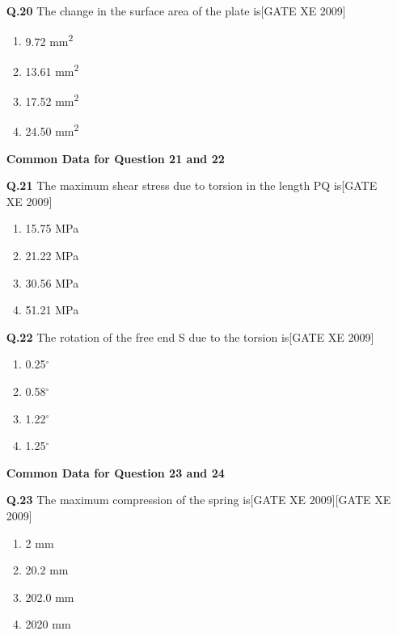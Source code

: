 \documentclass[journal,12pt,onecolumn]{IEEEtran}
\theoremstyle{remark}
\begin{document}
\begin{enumerate}
\begin{enumerate}
\vspace{0.3cm}

\item[ \textbf{Q.20}] The change in the surface area of the plate is\hfill[GATE XE 2009]
\begin{multicols}{2}
\begin{enumerate}
    \item 9.72 mm\textsuperscript{2}
    \item 13.61 mm\textsuperscript{2}
    \item 17.52 mm\textsuperscript{2}
    \item 24.50 mm\textsuperscript{2}
\end{enumerate}
\end{multicols}

\vspace{0.3cm}

\textbf{Common Data for Question 21 and 22}

\item[ \textbf{Q.21}] The maximum shear stress due to torsion in the length PQ is\hfill[GATE XE 2009]
\begin{multicols}{2}
\begin{enumerate}
    \item 15.75 MPa
    \item 21.22 MPa
    \item 30.56 MPa
    \item 51.21 MPa
\end{enumerate}
\end{multicols}

\item [\textbf{Q.22}] The rotation of the free end S due to the torsion is\hfill[GATE XE 2009]
\begin{multicols}{2}
\begin{enumerate}
    \item 0.25$^\circ$
    \item 0.58$^\circ$
    \item 1.22$^\circ$
    \item 1.25$^\circ$
\end{enumerate}
\end{multicols}

\vspace{0.3cm}

\textbf{Common Data for Question 23 and 24}

\item [\textbf{Q.23}] The maximum compression of the spring is\hfill[GATE XE 2009]\hfill[GATE XE 2009]
\begin{multicols}{2}
\begin{enumerate}
    \item 2 mm
    \item 20.2 mm
    \item 202.0 mm
    \item 2020 mm
\end{enumerate}
\end{multicols}


\end{enumerate}
\end{enumerate}
\end{document}
